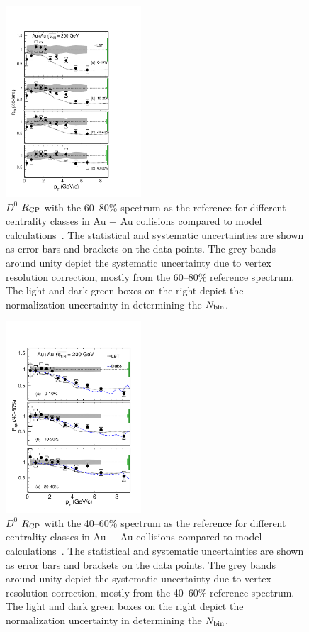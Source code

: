 \documentclass[%
 reprint,	
 amsmath,amssymb,
 aps,
 prc,
]{revtex4-1}
\begin{document}
\begin{figure}
\centering
\includegraphics[width=0.45\textwidth]{fig/D0_Rcp11.pdf}
\caption{$D^{0}$ $R_{\rm CP}$ with the 60--80\% spectrum as the reference for different centrality classes in Au + Au collisions compared to model calculations~\cite{Cao:2016gvr,LBT:private}. The statistical and systematic uncertainties are shown as error bars and brackets on the data points. The grey bands around unity depict the systematic uncertainty due to vertex resolution correction, mostly from the 60--80\% reference spectrum. The light and dark green boxes on the right depict the normalization uncertainty in determining the $N_{\rm bin}$.}
\label{fig:D0_Rcp11} 
\end{figure}

\begin{figure}
\centering
\includegraphics[width=0.45\textwidth]{fig/D0_Rcp22.pdf}
\caption{$D^{0}$ $R_{\rm CP}$ with the 40--60\% spectrum as the reference for different centrality classes in Au + Au collisions compared to model calculations~\cite{Cao:2016gvr,LBT:private,Xu:2017obm}. The statistical and systematic uncertainties are shown as error bars and brackets on the data points. The grey bands around unity depict the systematic uncertainty due to vertex resolution correction, mostly from the 40--60\% reference spectrum. The light and dark green boxes on the right depict the normalization uncertainty in determining the $N_{\rm bin}$.}
\label{fig:D0_Rcp22} 
\end{figure}
\end{document}
